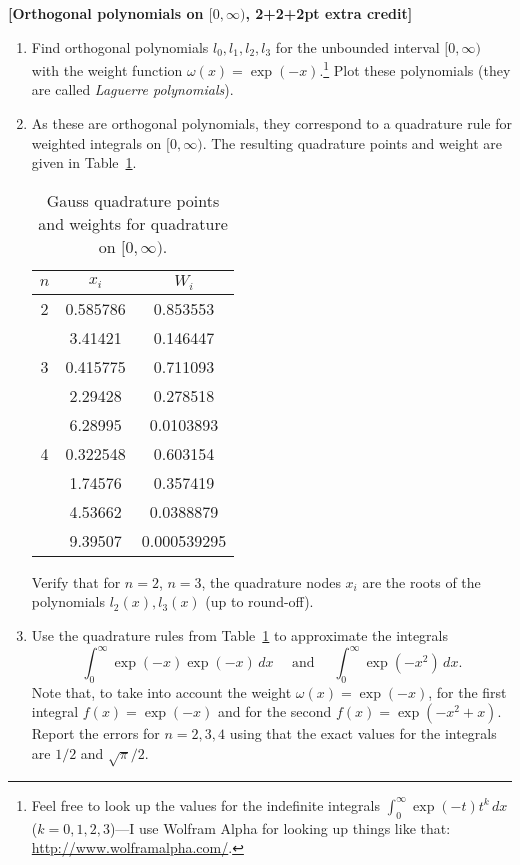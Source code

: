\documentclass[11pt,letterpaper]{article}
\begin{document}
 

\item {\bf [Orthogonal polynomials on $[0,\infty)$, 2+2+2pt extra credit]}
  \begin{enumerate}
  \item   Find  orthogonal   polynomials  $l_0,l_1,l_2,l_3$   for  the
    unbounded   interval  $[0,\infty)$   with   the  weight   function
    $\omega(x)=\exp(-x)$.\footnote{Feel free to look up the values for
      the    indefinite    integrals    $\int_0^\infty\exp(-t)t^k\,dx$
      ($k=0,1,2,3$)---I use  Wolfram Alpha for looking  up things like
      that:     \url{http://www.wolframalpha.com/}.}    Plot     these
    polynomials (they are called \emph{Laguerre polynomials}).
  \item As these are orthogonal polynomials, they correspond to a
    quadrature rule for weighted integrals on $[0,\infty)$. The
    resulting quadrature points and weight are given in
    Table~\ref{tab}.
    \begin{table}[h]\centering
      \caption{Gauss quadrature points and weights for quadrature on
        $[0,\infty)$.\label{tab}}
      \begin{tabular}{ccc}
        $n$&	$x_i$ &	$W_i$\\ \hline
        2&0.585786&	0.853553\\
        &3.41421&	0.146447\\ \hline
        3	&0.415775&	0.711093\\
        &2.29428&	0.278518\\
        &6.28995&	0.0103893\\ \hline
        4&	0.322548&	0.603154\\
        &1.74576&	0.357419\\
        &4.53662&	0.0388879\\
        &9.39507&	0.000539295\\ \hline
      \end{tabular}
    \end{table}
    Verify that for $n=2$, $n=3$, the quadrature nodes $x_i$ are the
    roots of the polynomials $l_2(x),l_3(x)$ (up to round-off).
  \item Use the quadrature rules from Table~\ref{tab} to approximate
    the integrals
    $$
    \int_0^\infty \exp(-x) \exp(-x)\, dx \quad\text{ and }\quad \int_0^\infty \exp(-x^2)\, dx.
    $$
    Note that, to take into account the weight $\omega(x) = \exp(-x)$,
    for the first integral $f(x) = \exp(-x)$ and for the second $f(x)
    = \exp(-x^2+x)$. Report the errors for $n=2,3,4$ using that the
    exact values for the integrals are $1/2$ and $\sqrt{\pi}/2$.
  \end{enumerate}

  
\vfill
\printbibliography
\end{document}
